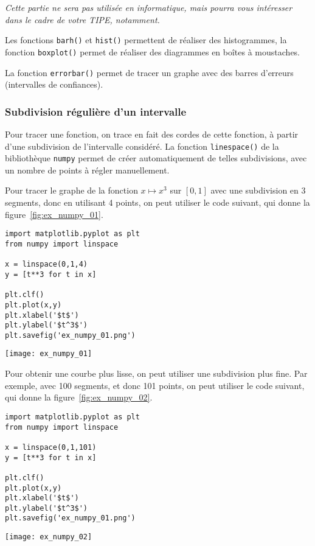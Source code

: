 \emph{Cette partie ne sera pas utilisée en informatique, mais pourra vous intéresser dans le cadre de votre TIPE, notamment.}

Les fonctions \texttt{barh()} et \texttt{hist()} permettent de réaliser des histogrammes, la fonction \texttt{boxplot()} permet de réaliser des diagrammes en boîtes à moustaches.

La fonction \texttt{errorbar()} permet de tracer un graphe avec des barres d'erreurs (intervalles de confiances). 

\subsubsection{Subdivision régulière d'un intervalle}

Pour tracer une fonction, on trace en fait des cordes de cette fonction, à partir d'une subdivision de l'intervalle considéré. 
La fonction \texttt{linespace()} de la bibliothèque \texttt{numpy} permet de créer automatiquement de telles subdivisions, avec un nombre de points à régler manuellement. 

\begin{exemple}
Pour tracer le graphe de la fonction $x\mapsto x^3$ sur $[0,1]$ avec une subdivision en 3 segments, donc en utilisant 
4 points, on peut utiliser le code suivant, qui donne la figure~\ref{fig:ex_numpy_01}.
\begin{lstlisting}
import matplotlib.pyplot as plt
from numpy import linspace

x = linspace(0,1,4)
y = [t**3 for t in x]

plt.clf()
plt.plot(x,y)
plt.xlabel('$t$')
plt.ylabel('$t^3$')
plt.savefig('ex_numpy_01.png')
\end{lstlisting}

  \begin{center}
    \texttt{[image: ex\_numpy\_01]}
    \label{fig:ex_numpy_01}
  \end{center}
Pour obtenir une courbe plus lisse, on peut utiliser une subdivision plus fine. Par exemple, avec 100 segments, et donc 101 points, on peut utiliser le code suivant, qui donne la figure~\ref{fig:ex_numpy_02}.
\begin{lstlisting}
import matplotlib.pyplot as plt
from numpy import linspace

x = linspace(0,1,101)
y = [t**3 for t in x]

plt.clf()
plt.plot(x,y)
plt.xlabel('$t$')
plt.ylabel('$t^3$')
plt.savefig('ex_numpy_01.png')
\end{lstlisting}

  \begin{center}
    \texttt{[image: ex\_numpy\_02]}
    \label{fig:ex_numpy_02}
  \end{center}
\end{exemple}


